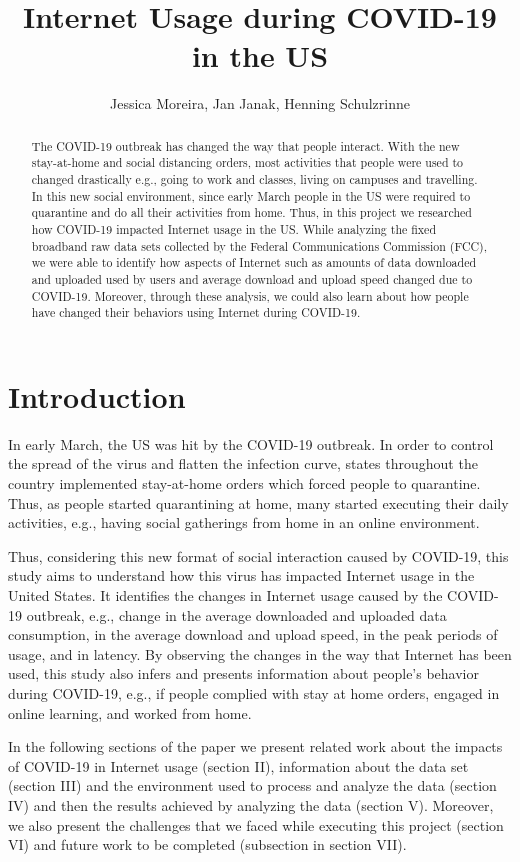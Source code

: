 \documentclass[conference]{IEEEtran}
\title{Internet Usage during COVID-19 in the US}
\author{Jessica Moreira, Jan Janak, Henning Schulzrinne}
\date{}
\begin{document}
\maketitle

\begin{abstract}
The COVID-19 outbreak has changed the way that people interact. With the new stay-at-home and social distancing orders, most activities that people were used to changed drastically e.g., going to work and classes, living on campuses and travelling. In this new social environment, since early March people in the US were required to quarantine and do all their activities from home. Thus, in this project we researched how COVID-19 impacted Internet usage in the US. While analyzing the fixed broadband raw data sets collected by the Federal Communications Commission (FCC), we were able to identify how aspects of  Internet such as amounts of data downloaded and uploaded used by users and  average download and upload speed changed due to COVID-19. Moreover, through these analysis, we could also learn about how people have changed their behaviors using  Internet during COVID-19. 
\end{abstract}

\section{Introduction}
\label{sec:introduction}
In early March, the US was hit by the COVID-19 outbreak. In order to control the spread of the virus and flatten the infection curve, states throughout the country implemented stay-at-home orders which forced people to quarantine. Thus, as people started quarantining at home, many started executing their daily activities, e.g., having social gatherings from home in an online environment.

Thus, considering this new format of social interaction caused by COVID-19, this study aims to understand how this virus has impacted  Internet usage in the United States. It identifies the changes in Internet usage caused by the COVID-19 outbreak, e.g., change in the average downloaded and uploaded data consumption, in the average download and upload speed, in the peak periods of usage, and in latency. By observing the changes in the way that  Internet has been used, this study also infers and presents information about people's behavior during COVID-19, e.g., if people complied with stay at home orders, engaged in online learning, and worked from home.

In the following sections of the paper we present related work about the impacts of COVID-19 in  Internet usage (section II), information about the data set (section III) and the environment used to process and analyze the data (section IV) and then the results achieved by analyzing the data (section V). Moreover, we also present the challenges that we faced while executing this project (section VI) and future work to be completed (subsection in section VII). 
\end{document}
